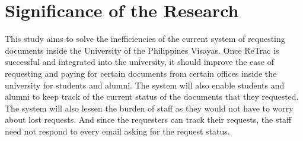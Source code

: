 \section{Significance of the Research}
\label{sec:significance}

This study aims to solve the inefficiencies of the current system of requesting documents inside the University of the Philippines Visayas. Once ReTrac is successful and integrated into the university, it should improve the ease of requesting and paying for certain documents from certain offices inside the university for students and alumni. The system will also enable students and alumni to keep track of the current status of the documents that they requested. The system will also lessen the burden of staff as they would not have to worry about lost requests. And since the requesters can track their requests, the staff need not respond to every email asking for the request status.


